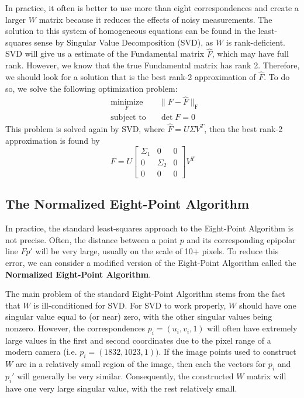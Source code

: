 \documentclass[a4paper, 12pt]{article}
\renewcommand\emph{\textbf}
\begin{document}
In practice, it often is better to use more than eight correspondences and create a larger $W$ matrix because it reduces the effects of noisy measurements. The solution to this system of homogeneous equations can be found in the least-squares sense by Singular Value Decomposition (SVD), as $W$ is rank-deficient. SVD will give us a estimate of the Fundamental matrix $\hat{F}$, which may have full rank. However, we know that the true Fundamental matrix has rank 2. Therefore, we should look for a solution that is the best rank-2 approximation of $\hat{F}$. To do so, we solve the following optimization problem:
\begin{equation}
\begin{aligned}
& \underset{F}{\text{minimize}}
& & \|F-\hat{F}\|_\mathrm{F}  \\
& \text{subject to}
& & \det F = 0
\end{aligned}
\end{equation}
This problem is solved again by SVD, where $\hat{F} = U\Sigma V^T$, then the best rank-2 approximation is found by
\begin{equation}
F = U\begin{bmatrix}\Sigma_1&0&0\\0&\Sigma_2&0\\0&0&0\end{bmatrix}V^T
\end{equation}

\subsection{The Normalized Eight-Point Algorithm}
In practice, the standard least-squares approach to the Eight-Point Algorithm is not precise. Often, the distance between a point $p$ and its corresponding epipolar line $Fp'$ will be very large, usually on the scale of 10+ pixels. To reduce this error, we can consider a modified version of the Eight-Point Algorithm called the \emph{Normalized Eight-Point Algorithm}. 

The main problem of the standard Eight-Point Algorithm stems from the fact that $W$ is ill-conditioned for SVD. For SVD to work properly, $W$ should have one singular value equal to (or near) zero, with the other singular values being nonzero. However, the correspondences $p_i = (u_i, v_i, 1)$ will often have extremely large values in the first and second coordinates due to the pixel range of a modern camera (i.e. $p_i = (1832, 1023, 1))$. If the image points used to construct $W$ are in a relatively small region of the image, then each the vectors for $p_i$ and $p_i'$ will generally be very similar. Consequently, the constructed $W$ matrix will have one very large singular value, with the rest relatively small. 
\end{document}

